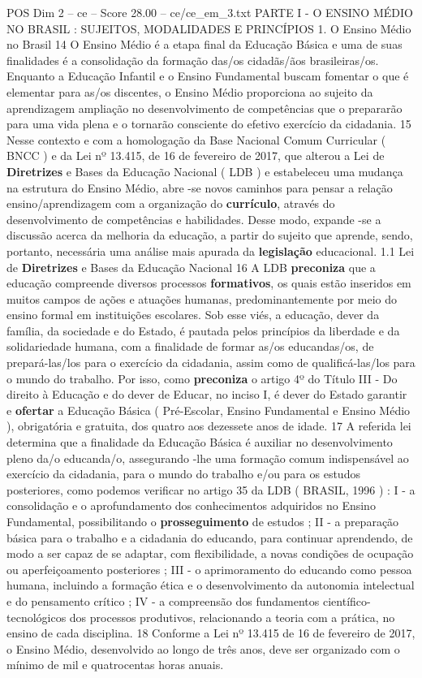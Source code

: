 \begin{textsample}{POS Dim 2 – ce – Score 28.00 – ce/ce\_em\_3.txt}  \label{ex:f2_pos_085}
PARTE I - O ENSINO MÉDIO NO BRASIL : SUJEITOS, MODALIDADES E PRINCÍPIOS 1.
O Ensino Médio no Brasil 14 O Ensino Médio é a etapa final da Educação Básica e uma de suas finalidades é a consolidação da formação das/os cidadãs/ãos brasileiras/os.
Enquanto a Educação Infantil e o Ensino Fundamental buscam fomentar o que é elementar para as/os discentes, o Ensino Médio proporciona ao sujeito da aprendizagem ampliação no desenvolvimento de competências que o prepararão para uma vida plena e o tornarão consciente do efetivo exercício da cidadania. 15 Nesse contexto e com a homologação da Base Nacional Comum Curricular ( BNCC ) e da Lei nº 13.415, de 16 de fevereiro de 2017, que alterou a Lei de \textbf{Diretrizes} e Bases da Educação Nacional ( LDB ) e estabeleceu uma mudança na estrutura do Ensino Médio, abre -se novos caminhos para pensar a relação ensino/aprendizagem com a organização do \textbf{currículo}, através do desenvolvimento de competências e habilidades.
Desse modo, expande -se a discussão acerca da melhoria da educação, a partir do sujeito que aprende, sendo, portanto, necessária uma análise mais apurada da \textbf{legislação} educacional. 1.1 Lei de \textbf{Diretrizes} e Bases da Educação Nacional 16 A LDB \textbf{preconiza} que a educação compreende diversos processos \textbf{formativos}, os quais estão inseridos em muitos campos de ações e atuações humanas, predominantemente por meio do ensino formal em instituições escolares.
Sob esse viés, a educação, dever da família, da sociedade e do Estado, é pautada pelos princípios da liberdade e da solidariedade humana, com a finalidade de formar as/os educandas/os, de prepará-las/los para o exercício da cidadania, assim como de qualificá-las/los para o mundo do trabalho.
Por isso, como \textbf{preconiza} o artigo 4º do Título III - Do direito à Educação e do dever de Educar, no inciso I, é dever do Estado garantir e \textbf{ofertar} a Educação Básica ( Pré-Escolar, Ensino Fundamental e Ensino Médio ), obrigatória e gratuita, dos quatro aos dezessete anos de idade. 17 A referida lei determina que a finalidade da Educação Básica é auxiliar no desenvolvimento pleno da/o educanda/o, assegurando -lhe uma formação comum indispensável ao exercício da cidadania, para o mundo do trabalho e/ou para os estudos posteriores, como podemos verificar no artigo 35 da LDB ( BRASIL, 1996 ) : I - a consolidação e o aprofundamento dos conhecimentos adquiridos no Ensino Fundamental, possibilitando o \textbf{prosseguimento} de estudos ; II - a preparação básica para o trabalho e a cidadania do educando, para continuar aprendendo, de modo a ser capaz de se adaptar, com flexibilidade, a novas condições de ocupação ou aperfeiçoamento posteriores ; III - o aprimoramento do educando como pessoa humana, incluindo a formação ética e o desenvolvimento da autonomia intelectual e do pensamento crítico ; IV - a compreensão dos fundamentos científico-tecnológicos dos processos produtivos, relacionando a teoria com a prática, no ensino de cada disciplina. 18 Conforme a Lei nº 13.415 de 16 de fevereiro de 2017, o Ensino Médio, desenvolvido ao longo de três anos, deve ser organizado com o mínimo de mil e quatrocentas horas anuais.

\end{textsample}
